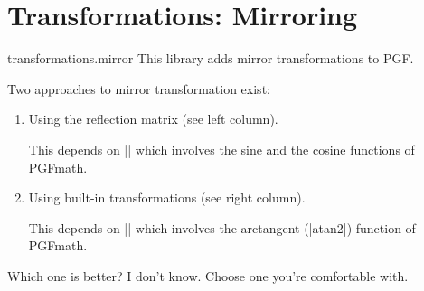 %
%
%

\section{Transformations: Mirroring}
\label{pgflibrary:transformations}

\begin{pgflibrary}{transformations.mirror}
  This library adds mirror transformations to PGF.
\end{pgflibrary}

Two approaches to mirror transformation exist:
\begin{enumerate}
\item Using the reflection matrix (see left column).

  This depends on |\pgfpointnormalised| which involves the sine and the cosine functions of PGFmath.

\item Using built-in transformations (see right column).

  This depends on |\pgfmathanglebetween| which involves the arctangent (|atan2|) function of PGFmath.
\end{enumerate}

Which one is better? I don't know.
Choose one you're comfortable with.

